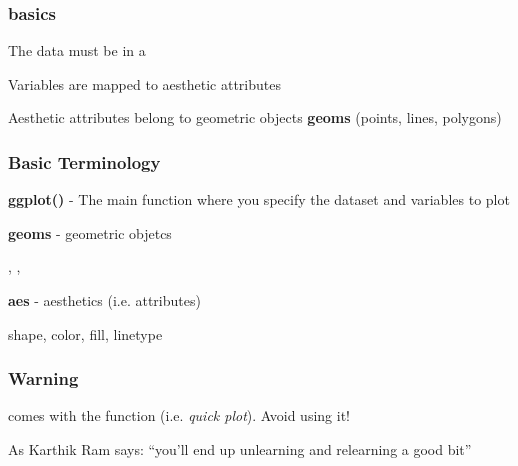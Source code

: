 \documentclass[12pt]{beamer}\usepackage[]{graphicx}\usepackage[]{color}
\begin{document}

\begin{frame}
\frametitle{ basics}

\bbi
  \item The data must be in a 
  \item Variables are mapped to aesthetic attributes
  \item Aesthetic attributes belong to geometric objects \textbf{geoms} (points, lines, polygons)
\ei

\end{frame}


\begin{frame}
\frametitle{Basic Terminology}

\bbi
  \item \textbf{ggplot()} - The main function where you specify the dataset and variables to plot
  \item \textbf{geoms} - geometric objetcs
  \bi
    \item {}, , 
  \ei
  \item \textbf{aes} - aesthetics (i.e. attributes)
  \bi
    \item shape, color, fill, linetype
  \ei
\ei

\end{frame}


\begin{frame}
\frametitle{Warning}

 comes with the function {\hilit {}} (i.e. \textit{quick plot}). Avoid using it! 

\bigskip
As Karthik Ram says: ``you'll end up unlearning and relearning a good bit''
\end{frame}

\end{document}

